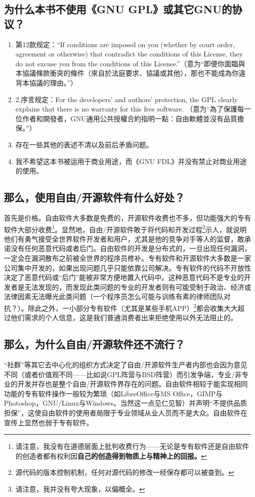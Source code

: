 \subsection{为什么本书不使用《GNU GPL》或其它GNU的协议？}
\begin{enumerate}
	\item 第12款规定：“If conditions are imposed on you (whether by court order, agreement or otherwise) that contradict the conditions of this License, they do not excuse you from the conditions of this License.”（意为“即便你面臨與本協議條款衝突的條件（來自於法庭要求、協議或其他），那也不能成為你違背本協議的理由。”）
	\item 2.序言规定：For the developers' and authors' protection, the GPL clearly explains that there is no warranty for this free software. （意为“為了保護每一位作者和開發者，GNU通用公共授權合約指明一點：自由軟體並沒有品質擔保。”）
	\item 存在一些其他的表述不清以及前后矛盾问题。
	\item 我不希望这本书被运用于商业用途，而《GNU FDL》并没有禁止对商业用途的使用。
\end{enumerate}
\subsection{那么，使用自由/开源软件有什么好处？}
首先是价格。自由软件大多数是免费的，开源软件收费也不多，但功能强大的专有软件大部分收费\footnote{请注意，我没有在道德层面上批判收费行为——无论是专有软件还是自由软件的创造者都有权利因\bf 自己的\normalall 创造得到物质上与精神上的回报。}。显然地，自由/开源软件敢于将代码和开发过程\footnote{源代码的版本控制机制，任何对源代码的修改一经保存都可以被查到。}示人，就说明他们有勇气接受全世界软件开发者和用户，尤其是他的竞争对手等人的监督，敢承诺没有任何恶意代码或者后门。自由软件的开发是分布式的，一旦出现任何漏洞，一定会在漏洞散布之前被全世界的程序员修补。专有软件和开源软件大多数是一家公司集中开发的，如果出现问题几乎只能依靠公司解决。专有软件的代码不开放性决定了恶意代码或“后门”能被非常方便地置入代码中。这种恶意代码不是专业的开发者是无法发现的，而发现此类问题的专业的开发者则有可能受制于政治、经济或法律因素无法曝光此类问题（一个程序员怎么可能与训练有素的律师团队对抗？）。除此之外，一小部分专有软件（尤其是某些手机APP）\footnote{请注意，我并没有夸大现象，以偏概全。}都会收集大大超过他们需求的个人信息，这是我们普通消费者出来拒绝使用以外无法阻止的。
\subsection{那么，为什么自由/开源软件还不流行？}
“社群”等其它去中心化的组织方式决定了自由/开源软件生产者内部也会因为意见不同（或者价值观不同——比如说GPL阵营与BSD阵营）而引发争端，专业/非专业的开发并存也是整个自由/开源软件界存在的问题。自由软件相较于能实现相同功能的专有软件操作一般较为繁琐（如LibreOffice与MS Office，GIMP与Photoshop，GNU/Linux与Windows。当然这一点见仁见智）并声明“不提供品质担保”，这使自由软件的使用者局限于专业领域从业人员而不是大众。自由软件在宣传上显然也弱于专有软件。